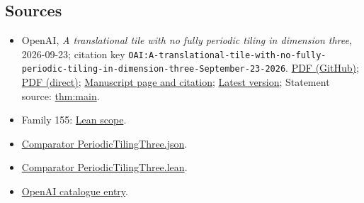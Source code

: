 \documentclass[11pt]{article}
\begin{document}
\subsection{Sources}
\begin{itemize}
\item OpenAI, \emph{A translational tile with no fully periodic tiling in dimension three}, 2026-09-23; citation key \texttt{OAI:A-translational-tile-with-no-fully-periodic-tiling-in-dimension-three-September-23-2026}. \href{https://github.com/openai/math/blob/adc7f1241b42e322a6451854ab7e4b4c146bf78a/preprints/A-translational-tile-with-no-fully-periodic-tiling-in-dimension-three-September-23-2026/paper.pdf}{PDF (GitHub)}; \href{https://github.com/openai/math/raw/adc7f1241b42e322a6451854ab7e4b4c146bf78a/preprints/A-translational-tile-with-no-fully-periodic-tiling-in-dimension-three-September-23-2026/paper.pdf}{PDF (direct)}; \href{https://github.com/openai/math/blob/adc7f1241b42e322a6451854ab7e4b4c146bf78a/preprints/A-translational-tile-with-no-fully-periodic-tiling-in-dimension-three-September-23-2026/README.md}{Manuscript page and citation}; \href{https://github.com/openai/math/blob/main/preprints/A-translational-tile-with-no-fully-periodic-tiling-in-dimension-three-September-23-2026/paper.pdf}{Latest version}; Statement source: \href{https://github.com/openai/math/blob/adc7f1241b42e322a6451854ab7e4b4c146bf78a/preprints/A-translational-tile-with-no-fully-periodic-tiling-in-dimension-three-September-23-2026/build/paper.tex\#L79}{thm:main}.
\item Family 155: \href{https://github.com/openai/math/blob/adc7f1241b42e322a6451854ab7e4b4c146bf78a/lean/docs/155.md}{Lean scope}.
\item \href{https://github.com/openai/math/blob/adc7f1241b42e322a6451854ab7e4b4c146bf78a/lean/ComparatorChallenges/PeriodicTilingThree.json}{Comparator PeriodicTilingThree.json}.
\item \href{https://github.com/openai/math/blob/adc7f1241b42e322a6451854ab7e4b4c146bf78a/lean/ComparatorChallenges/PeriodicTilingThree.lean}{Comparator PeriodicTilingThree.lean}.
\item \href{https://github.com/openai/math/blob/adc7f1241b42e322a6451854ab7e4b4c146bf78a/CONTENTS.md}{OpenAI catalogue entry}.
\end{itemize}
\end{document}
